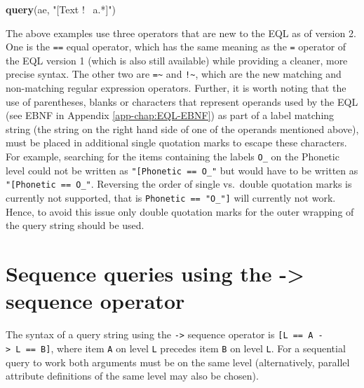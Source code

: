 \documentclass[]{book}
\newenvironment{Shaded}{\begin{snugshade}}{\end{snugshade}}
\newcommand{\KeywordTok}[1]{\textcolor[rgb]{0.13,0.29,0.53}{\textbf{#1}}}
\newcommand{\NormalTok}[1]{#1}
\newcommand{\StringTok}[1]{\textcolor[rgb]{0.31,0.60,0.02}{#1}}
\theoremstyle{definition}
\theoremstyle{definition}
\theoremstyle{definition}
\theoremstyle{remark}
\begin{document}
\begin{Shaded}
\begin{Highlighting}[]
\KeywordTok{query}\NormalTok{(ae, }\StringTok{"[Text !~ a.*]"}\NormalTok{)}
\end{Highlighting}
\end{Shaded}

The above examples use three operators that are new to the EQL as of
version 2. One is the \texttt{==} equal operator, which has the same
meaning as the \texttt{=} operator of the EQL version 1 (which is also
still available) while providing a cleaner, more precise syntax. The
other two are \texttt{=\textasciitilde{}} and
\texttt{!\textasciitilde{}}, which are the new matching and non-matching
regular expression operators. Further, it is worth noting that the use
of parentheses, blanks or characters that represent operands used by the
EQL (see EBNF in Appendix \ref{app-chap:EQL-EBNF}) as part of a label
matching string (the string on the right hand side of one of the
operands mentioned above), must be placed in additional single quotation
marks to escape these characters. For example, searching for the items
containing the labels \texttt{O\_\textquotesingle{}} on the Phonetic
level could not be written as
\texttt{"{[}Phonetic\ ==\ O\_\textquotesingle{}{]}"} but would have to
be written as
\texttt{"{[}Phonetic\ ==\ \textquotesingle{}O\_\textquotesingle{}\textquotesingle{}{]}"}.
Reversing the order of single vs.~double quotation marks is currently
not supported, that is
\texttt{\textquotesingle{}{[}Phonetic\ ==\ "O\_\textquotesingle{}"{]}\textquotesingle{}}
will currently not work. Hence, to avoid this issue only double
quotation marks for the outer wrapping of the query string should be
used.

\hypertarget{sequence-queries-using-the---sequence-operator}{%
\section{Sequence queries using the -\textgreater{} sequence
operator}\label{sequence-queries-using-the---sequence-operator}}

The syntax of a query string using the \texttt{-\textgreater{}} sequence
operator is \texttt{{[}L\ ==\ A\ -\textgreater{}\ L\ ==\ B{]}}, where
item \texttt{A} on level \texttt{L} precedes item \texttt{B} on level
\texttt{L}. For a sequential query to work both arguments must be on the
same level (alternatively, parallel attribute definitions of the same
level may also be chosen).
\end{document}
